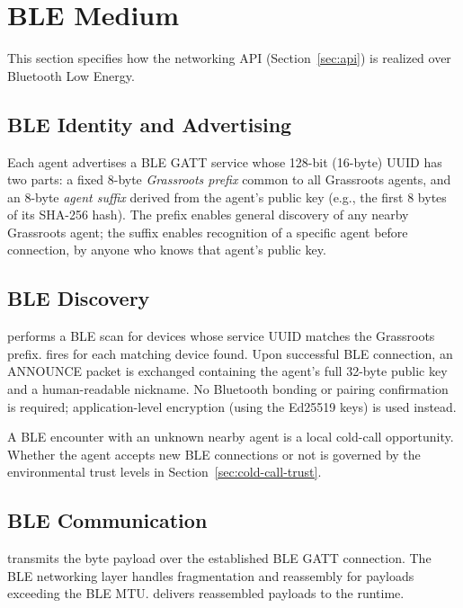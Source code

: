 \section{BLE Medium}
\label{sec:ble}
This section specifies how the networking API (Section~\ref{sec:api}) is realized over Bluetooth Low Energy.
\subsection{BLE Identity and Advertising}
\label{sec:ble-identity}
Each agent advertises a BLE GATT service whose 128-bit (16-byte) UUID has two parts: a fixed 8-byte \emph{Grassroots prefix} common to all Grassroots agents, and an 8-byte \emph{agent suffix} derived from the agent's public key (e.g., the first 8 bytes of its SHA-256 hash). The prefix enables general discovery of any nearby Grassroots agent; the suffix enables recognition of a specific agent before connection, by anyone who knows that agent's public key.
\subsection{BLE Discovery}
\label{sec:ble-discovery}
 performs a BLE scan for devices whose service UUID matches the Grassroots prefix.  fires for each matching device found.
Upon successful BLE connection, an ANNOUNCE packet is exchanged containing the agent's full 32-byte public key and a human-readable nickname. No Bluetooth bonding or pairing confirmation is required; application-level encryption (using the Ed25519 keys) is used instead.

A BLE encounter with an unknown nearby agent is a local cold-call opportunity. Whether the agent accepts new BLE connections or not is governed by the environmental trust levels in Section~\ref{sec:cold-call-trust}.
\subsection{BLE Communication}
\label{sec:ble-comm}
 transmits the byte payload over the established BLE GATT connection. The BLE networking layer handles fragmentation and reassembly for payloads exceeding the BLE MTU.  delivers reassembled payloads to the runtime.